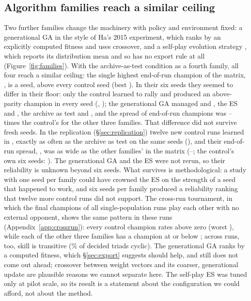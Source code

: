 \documentclass[11pt]{article}
\begin{document}
\subsection{Algorithm families reach a similar ceiling}
\label{sec:families}

Two further families change the machinery with policy and environment fixed: a
generational GA in the style of Ha's 2015 experiment, which ranks by an
explicitly computed fitness and uses crossover, and a self-play evolution
strategy \citep{salimans2017evolution,ha2017estool}, which reports its
distribution mean and so has no export rule at all (Figure~\ref{fig:families}).
With the archive-as-test condition as a fourth family, all four reach a
similar ceiling: the single highest end-of-run champion of the matrix,
\nBestEndpoint, is a \nBestEndpointLabel{} seed, above every control seed
(best \nCtrlBestEndpoint). In their six seeds they seemed to differ in their
floor: only the control learned to rally and produced an above-parity champion
in every seed (\nCtrlReached, \nCtrlParity); the generational GA managed
\nGaReached{} and \nGaParity, the ES \nEsReached{} and \nEsParity, the
archive as test \nHoftestReached{} and \nHoftestParity, and the spread of
end-of-run champions was \nFamilySdRatioMin--\nFamilySdRatioMax{} times the
control's for the other three families. That difference did not survive fresh
seeds. In the replication (\S\ref{sec:replication}) twelve new control runs
learned in \nRepCtrlLearned, exactly as often as the archive as test on the same
seeds (\nRepTestLearnedN), and their end-of-run spread, \nRepCtrlFinalSd, was
as wide as the other families' in the matrix
(\nFamFinalSdMin--\nFamFinalSdMax; the control's own six seeds:
\nCtrlFinalSd). The generational GA and the ES were not rerun, so their
reliability is unknown beyond six seeds. What survives is methodological: a study with one seed per
family could have crowned the ES on the strength of a seed that happened to
work, and six seeds per family produced a reliability ranking that twelve more
control runs did not support. The cross-run tournament, in which
the final champions of all \nAcrossN{} single-population runs play each other
with no external opponent, shows the same pattern in these runs
(Appendix~\ref{app:crossrun}): every control champion rates above zero (worst
\nEloWorstCtrl), while each of the other three families has a champion at or
below \nEloWorstOthersMax; across runs, too, skill is transitive
(\nAcrossCyclicPct\% of decided triads cyclic). The generational GA ranks by a
computed fitness, which \S\ref{sec:export} suggests should help, and still does
not come out ahead; crossover between weight vectors and its coarser,
generational update are plausible reasons we cannot separate here.
The self-play ES was tuned only at pilot scale, so its result is a statement
about the configuration we could afford, not about the method.
\end{document}
